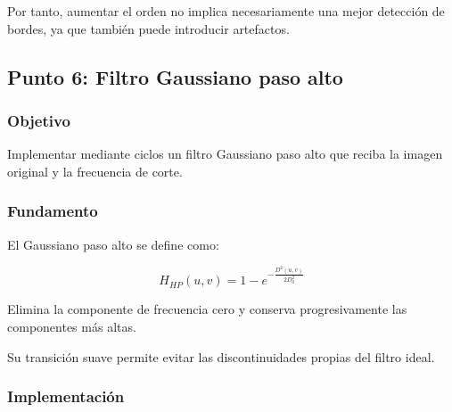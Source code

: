 \documentclass[11pt,letterpaper]{article}
\begin{document}
Por tanto, aumentar el orden no implica
necesariamente una mejor detección
de bordes, ya que también puede
introducir artefactos.

\subsection{Punto 6: Filtro Gaussiano paso alto}

\subsubsection*{Objetivo}

Implementar mediante ciclos un filtro
Gaussiano paso alto que reciba la imagen
original y la frecuencia de corte.

\subsubsection*{Fundamento}

El Gaussiano paso alto se define como:

\begin{equation}
H_{HP}(u,v)=
1-e^{-\frac{D^2(u,v)}{2D_0^2}}
\end{equation}

Elimina la componente de frecuencia cero
y conserva progresivamente las componentes
más altas.

Su transición suave permite evitar
las discontinuidades propias
del filtro ideal.

\subsubsection*{Implementación}
\end{document}
